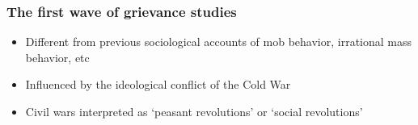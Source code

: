 \documentclass[aspectratio=43]{beamer}
\begin{document}
\begin{frame}
\frametitle{The first wave of grievance studies}
\centering

\begin{itemize}
  \item Different from previous sociological accounts of mob behavior, irrational mass behavior, etc
  \item Influenced by the ideological conflict of the Cold War
  \item Civil wars interpreted as `peasant revolutions' or `social revolutions'
\end{itemize}

\end{frame}
\end{document}
